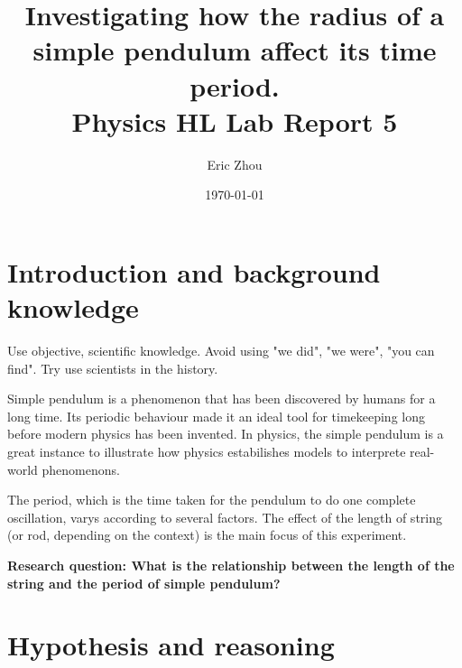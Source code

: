 \documentclass[a4paper]{article}
\begin{document}
\begin{titlepage}
    \title{\textbf{Investigating how the radius of a simple pendulum affect its time period. \\ \small Physics HL Lab Report 5}}
    \author{Eric Zhou}
    \date{\today}
    \maketitle
\end{titlepage}

\section{Introduction and background knowledge}

\begin{tcolorbox}[title = Note]
    Use objective, scientific knowledge. Avoid using "we did", "we were", "you can find". Try use scientists in the history.
\end{tcolorbox}

Simple pendulum is a phenomenon that has been discovered by humans for a long time. Its periodic behaviour made it an ideal tool for timekeeping long before modern physics has been invented. In physics, the simple pendulum is a great instance to illustrate how physics estabilishes models to interprete real-world phenomenons. 

The period, which is the time taken for the pendulum to do one complete oscillation, varys according to several factors. The effect of the length of string (or rod, depending on the context) is the main focus of this experiment.

\textbf{Research question: What is the relationship between the length of the string and the period of simple pendulum?}
\section{Hypothesis and reasoning}
\end{document}
